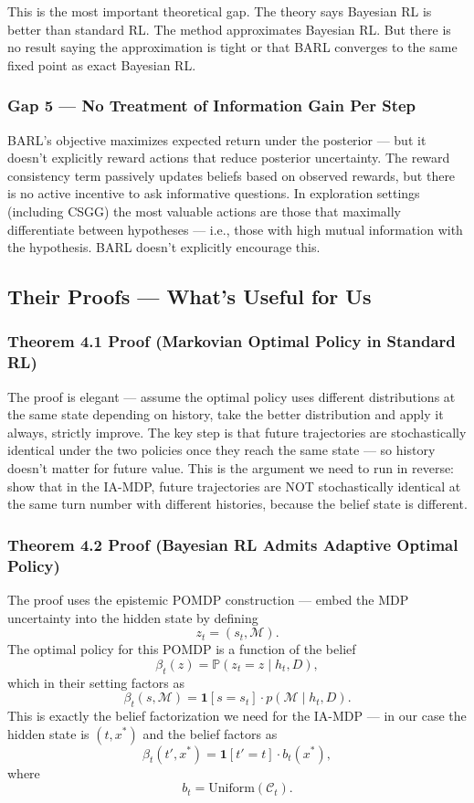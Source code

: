 \documentclass[11pt]{article}
\theoremstyle{plain}
\theoremstyle{definition}
\theoremstyle{remark}
\begin{document}
This is the most important theoretical gap. The theory says Bayesian RL is better than standard RL. The method approximates Bayesian RL. But there is no result saying the approximation is tight or that BARL converges to the same fixed point as exact Bayesian RL.

\subsubsection{Gap 5 --- No Treatment of Information Gain Per Step}

BARL's objective maximizes expected return under the posterior --- but it doesn't explicitly reward actions that reduce posterior uncertainty. The reward consistency term passively updates beliefs based on observed rewards, but there is no active incentive to ask informative questions. In exploration settings (including CSGG) the most valuable actions are those that maximally differentiate between hypotheses --- i.e., those with high mutual information with the hypothesis. BARL doesn't explicitly encourage this.

\subsection{Their Proofs --- What's Useful for Us}

\subsubsection{Theorem 4.1 Proof (Markovian Optimal Policy in Standard RL)}

The proof is elegant --- assume the optimal policy uses different distributions at the same state depending on history, take the better distribution and apply it always, strictly improve. The key step is that future trajectories are stochastically identical under the two policies once they reach the same state --- so history doesn't matter for future value. This is the argument we need to run in reverse: show that in the IA-MDP, future trajectories are NOT stochastically identical at the same turn number with different histories, because the belief state is different.

\subsubsection{Theorem 4.2 Proof (Bayesian RL Admits Adaptive Optimal Policy)}

The proof uses the epistemic POMDP construction --- embed the MDP uncertainty into the hidden state by defining
\[
z_t = (s_t,\mathcal{M}).
\]
The optimal policy for this POMDP is a function of the belief
\[
\beta_t(z)
=
\mathbb{P}(z_t=z\mid h_t,D),
\]
which in their setting factors as
\[
\beta_t(s,\mathcal{M})
=
\mathbf{1}[s=s_t]\cdot p(\mathcal{M}\mid h_t,D).
\]
This is exactly the belief factorization we need for the IA-MDP --- in our case the hidden state is $(t,x^*)$ and the belief factors as
\[
\beta_t(t',x^*)
=
\mathbf{1}[t'=t]\cdot b_t(x^*),
\]
where
\[
b_t = \mathrm{Uniform}(\mathcal{C}_t).
\]
\end{document}
